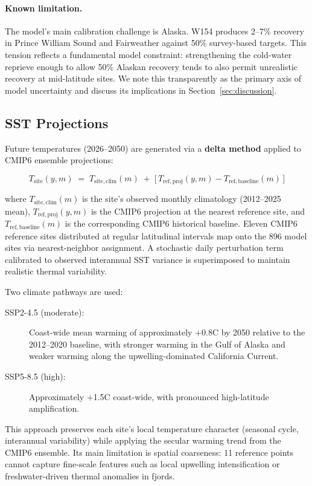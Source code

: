 \paragraph{Known limitation.}
The model's main calibration challenge is Alaska.  W154 produces 2--7\%
recovery in Prince William Sound and Fairweather against 50\% survey-based
targets.  This tension reflects a fundamental model constraint:
strengthening the cold-water reprieve enough to allow 50\% Alaskan recovery
tends to also permit unrealistic recovery at mid-latitude sites.  We note
this transparently as the primary axis of model uncertainty and discuss its
implications in Section~\ref{sec:discussion}.

\subsection{SST Projections}
\label{sec:sst_projections}

Future temperatures (2026--2050) are generated via a \textbf{delta method}
applied to CMIP6 ensemble projections:

\begin{equation}
  T_\mathrm{site}(y, m) \;=\; T_\mathrm{site,clim}(m) \;+\;
  \bigl[\, T_\mathrm{ref,proj}(y, m) - T_\mathrm{ref,baseline}(m) \,\bigr]
\end{equation}

\noindent where $T_\mathrm{site,clim}(m)$ is the site's observed monthly
climatology (2012--2025 mean), $T_\mathrm{ref,proj}(y, m)$ is the CMIP6
projection at the nearest reference site, and $T_\mathrm{ref,baseline}(m)$
is the corresponding CMIP6 historical baseline.  Eleven CMIP6 reference
sites distributed at regular latitudinal intervals map onto the 896 model
sites via nearest-neighbor assignment.  A stochastic daily perturbation
term calibrated to observed interannual SST variance is superimposed to
maintain realistic thermal variability.

Two climate pathways are used:
\begin{description}
  \item[SSP2-4.5 (moderate):] Coast-wide mean warming of approximately
    $+$0.8\textdegree C by 2050 relative to the 2012--2020 baseline, with
    stronger warming in the Gulf of Alaska and weaker warming along the
    upwelling-dominated California Current.
  \item[SSP5-8.5 (high):] Approximately $+$1.5\textdegree C coast-wide,
    with pronounced high-latitude amplification.
\end{description}

This approach preserves each site's local temperature character (seasonal
cycle, interannual variability) while applying the secular warming trend
from the CMIP6 ensemble.  Its main limitation is spatial coarseness: 11
reference points cannot capture fine-scale features such as local upwelling
intensification or freshwater-driven thermal anomalies in fjords.
